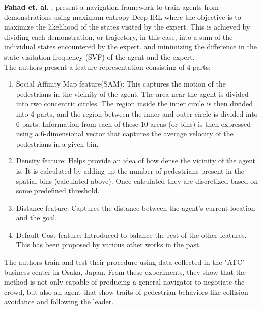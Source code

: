 \textbf{Fahad et. al.} \cite{fahad_learning_2018}, present a navigation framework to train agents from demonstrations using maximum entropy Deep IRL where the objective is to maximize the likelihood of the states visited by the expert.
This is achieved by dividing each demonstration, or trajectory, in this case, into a sum of the individual states encountered by the expert. and minimizing the difference in the state visitation frequency (SVF) of the agent and the expert.\\
The authors present a feature representation consisting of 4 parts:
\begin{enumerate}
    \item Social Affinity Map feature(SAM): This captures the motion of the pedestrians in the vicinity of the agent. The area near the agent is divided into two concentric circles. The region inside the inner circle is then divided into 4 parts, and the region between the inner and outer circle is divided into 6 parts.
    Information from each of these 10 areas (or bins) is then expressed using a 6-dimensional vector that captures the average velocity of the pedestrians in a given bin. 
    \item Density feature: Helps provide an idea of how dense the vicinity of the agent is. It is calculated by adding up the number of pedestrians present in the spatial bins (calculated above). Once calculated they are discretized based on some predefined threshold.
    \item Distance feature: Captures the distance between the agent's current location and the goal.
    \item Default Cost feature: Introduced to balance the rest of the other features. This has been proposed by various other works in the past.
    
\end{enumerate}
The authors train and test their procedure using data collected in the "ATC" business center in Osaka, Japan.
From these experiments, they show that the method is not only capable of producing a general navigator to negotiate the crowd, but also an agent that show traits of pedestrian behaviors like collision-avoidance and following the leader.


